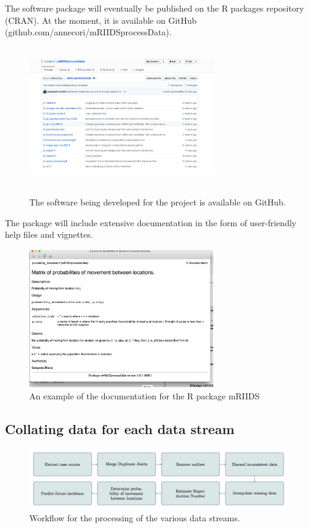 \documentclass[11pt,]{article}
\begin{document}
The software
package will eventually be published on the R packages repository
(CRAN). At the moment, it is available on GitHub (github.com/annecori/mRIIDSprocessData).

\begin{figure}
   \centering
  \includegraphics[width=8cm, height = 6cm]{ms6-figures/github-screenshot}
  \label{fig:github}
  \caption{The software being developed for the project is available
    on GitHub.}
\end{figure}


The package will include extensive documentation in the form of
user-friendly help files and vignettes.


\begin{figure}
  \centering
  \includegraphics[width=8cm, height = 6cm]{ms6-figures/Helpfile-screenshot}
  \caption{An example of the documentation for the R package mRIIDS}
  \label{fig:helpfile}
\end{figure}

\subsection{Collating data for each data stream}
\begin{center}
\begin{figure}
\includegraphics[]{ms6-figures/workflow}
\caption{Workflow for the processing of the various data streams.}
\label{fig:workflow}
\end{figure}
\end{center}
\end{document}
